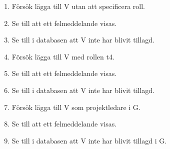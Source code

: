 \documentclass[a4paper]{article}
\begin{document}
\begin{FT}
\begin{enumerate}
\item Försök lägga till V utan att specificera roll.
\item Se till att ett felmeddelande visas.
\item Se till i databasen att V inte har blivit tillagd.
\item Försök lägga till V med rollen t4.
\item Se till att ett felmeddelande visas.
\item Se till i databasen att V inte har blivit tillagd.
\item Försök lägga till V som projektledare i G.
\item Se till att ett felmeddelande visas.
\item Se till i databasen att V inte har blivit tillagd i G.
\end{enumerate}
\end{FT}

\end{document}
